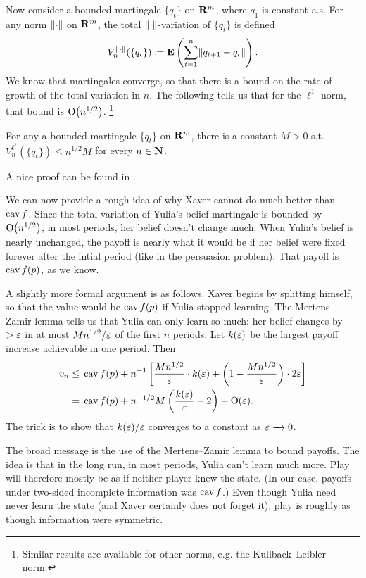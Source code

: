 \documentclass[11pt,letterpaper,reqno,oneside]{article}
\begin{document}
Now consider a bounded martingale $\{ q_t \}$ on $\mathbf{R}^m$, where $q_1$ is constant a.s. For any norm $\lVert\cdot\rVert$ on $\mathbf{R}^m$, the total $\lVert\cdot\rVert$-variation of $\{ q_t \}$ is defined
%
\begin{equation*}
	V^{\norm{\cdot}}_n(\{q_t\}) 
	\coloneqq \E\left( \sum_{t=1}^n \norm*{ q_{t+1} - q_t } \right) .
\end{equation*}
%
We know that martingales converge, so that there is a bound on the rate of growth of the total variation in $n$. The following tells us that for the $\ell^1$ norm, that bound is $\mathrm{O}\bigl( n^{1/2} \bigr)$.%
	\footnote{Similar results are available for other norms, e.g. the Kullback--Leibler norm.}
%
\begin{lemma}
	\label{lemma:MertensZamir}
	For any a bounded martingale $\{ q_t \}$ on $\mathbf{R}^m$, there is a constant $M > 0$ s.t. $V^{\ell^1}_n(\{q_t\}) \leq n^{1/2} M$ for every $n \in \mathbf{N}$.
\end{lemma}
%
\noindent
A nice proof can be found in \textcite{Neyman2013}.


We can now provide a rough idea of why Xaver cannot do much better than $\operatorname*{cav} f$. Since the total variation of Yulia's belief martingale is bounded by $\mathrm{O}\bigl( n^{1/2} \bigr)$, in most periods, her belief doesn't change much. When Yulia's belief is nearly unchanged, the payoff is nearly what it would be if her belief were fixed forever after the intial period (like in the persuasion problem). That payoff is $\operatorname*{cav} f(p)$, as we know.


A slightly more formal argument is as follows. Xaver begins by splitting himself, so that the value would be $\operatorname*{cav} f(p)$ if Yulia stopped learning. The Mertens--Zamir lemma tells us that Yulia can only learn so much: her belief changes by $>\varepsilon$ in at most $M n^{1/2} / \varepsilon$ of the first $n$ periods. Let $k(\varepsilon)$ be the largest payoff increase achievable in one period. Then
%
\begin{align*}
	v_n 
	\leq{}& \operatorname*{cav} f(p) 
	+ n^{-1} \left[ \frac{ M n^{1/2} }{ \varepsilon } \cdot k(\varepsilon) 
	+ \left( 1 - \frac{ M n^{1/2} }{ \varepsilon } \right) \cdot 2 \varepsilon \right]
	\\
	={}& \operatorname*{cav} f(p) 
	+ n^{-1/2} M \left( \frac{k(\varepsilon)}{\varepsilon} - 2 \right)
	+ \mathrm{O}(\varepsilon) .
\end{align*}
%
The trick is to show that $k(\varepsilon)/\varepsilon$ converges to a constant as $\varepsilon \xrightarrow{\;\;\;} 0$.


The broad message is the use of the Mertens--Zamir lemma to bound payoffs. The idea is that in the long run, in most periods, Yulia can't learn much more. Play will therefore mostly be as if neither player knew the state. (In our case, payoffs under two-sided incomplete information was $\operatorname*{cav} f$.) Even though Yulia need never learn the state (and Xaver certainly does not forget it), play is roughly as though information were symmetric.
\end{document}
